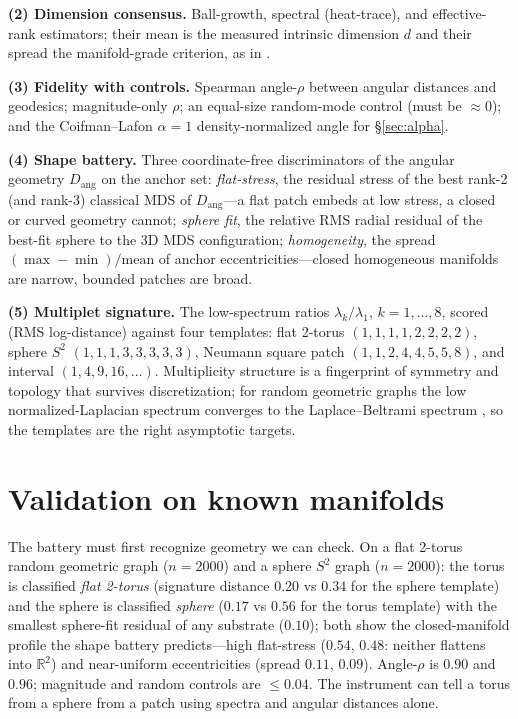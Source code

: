 \documentclass[11pt]{article}
\begin{document}
\textbf{(2) Dimension consensus.} Ball-growth, spectral (heat-trace), and
effective-rank estimators; their mean is the measured intrinsic dimension $d$
and their spread the manifold-grade criterion, as in \cite{kta}.

\textbf{(3) Fidelity with controls.} Spearman angle-$\rho$ between angular
distances and geodesics; magnitude-only $\rho$; an equal-size random-mode
control (must be $\approx0$); and the Coifman--Lafon $\alpha{=}1$
density-normalized angle \cite{coifman2006} for \S\ref{sec:alpha}.

\textbf{(4) Shape battery.} Three coordinate-free discriminators of the
angular geometry $D_{\mathrm{ang}}$ on the anchor set:
\emph{flat-stress}, the residual stress of the best rank-2 (and rank-3)
classical MDS of $D_{\mathrm{ang}}$---a flat patch embeds at low stress, a
closed or curved geometry cannot;
\emph{sphere fit}, the relative RMS radial residual of the best-fit sphere to
the 3D MDS configuration;
\emph{homogeneity}, the spread $(\max-\min)/\mathrm{mean}$ of anchor
eccentricities---closed homogeneous manifolds are narrow, bounded patches are
broad.

\textbf{(5) Multiplet signature.} The low-spectrum ratios
$\lambda_k/\lambda_1$, $k=1,\dots,8$, scored (RMS log-distance) against four
templates: flat 2-torus $(1,1,1,1,2,2,2,2)$, sphere $S^2$ $(1,1,1,3,3,3,3,3)$,
Neumann square patch $(1,1,2,4,4,5,5,8)$, and interval
$(1,4,9,16,\dots)$. Multiplicity structure is a fingerprint of symmetry and
topology that survives discretization; for random geometric graphs the low
normalized-Laplacian spectrum converges to the Laplace--Beltrami spectrum
\cite{garciatrillos2018,calder2022}, so the templates are the right asymptotic
targets.

\section{Validation on known manifolds}\label{sec:controls}
The battery must first recognize geometry we can check. On a flat 2-torus
random geometric graph ($n=2000$) and a sphere $S^2$ graph ($n=2000$):
the torus is classified \emph{flat 2-torus} (signature distance $0.20$ vs
$0.34$ for the sphere template) and the sphere is classified \emph{sphere}
($0.17$ vs $0.56$ for the torus template) with the smallest sphere-fit
residual of any substrate ($0.10$); both show the closed-manifold profile the
shape battery predicts---high flat-stress ($0.54$, $0.48$: neither flattens
into $\mathbb R^2$) and near-uniform eccentricities (spread $0.11$, $0.09$).
Angle-$\rho$ is $0.90$ and $0.96$; magnitude and random controls are
$\le0.04$. The instrument can tell a torus from a sphere from a patch using
spectra and angular distances alone.
\end{document}

